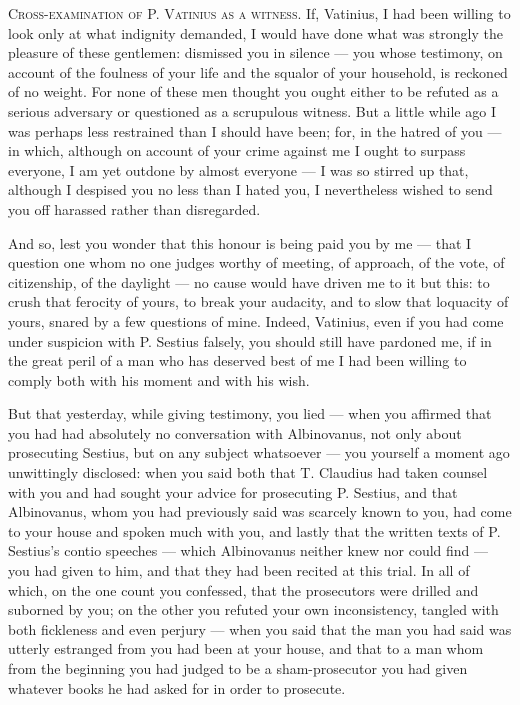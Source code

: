 
 \textsc{Cross-examination of P. Vatinius as a witness.} If, Vatinius, I had been willing to look only at what indignity demanded, I would have done what was strongly the pleasure of these gentlemen: dismissed you in silence --- you whose testimony, on account of the foulness of your life and the squalor of your household, is reckoned of no weight. For none of these men thought you ought either to be refuted as a serious adversary or questioned as a scrupulous witness. But a little while ago I was perhaps less restrained than I should have been; for, in the hatred of you --- in which, although on account of your crime against me I ought to surpass everyone, I am yet outdone by almost everyone --- I was so stirred up that, although I despised you no less than I hated you, I nevertheless wished to send you off harassed rather than disregarded.

 And so, lest you wonder that this honour is being paid you by me --- that I question one whom no one judges worthy of meeting, of approach, of the vote, of citizenship, of the daylight --- no cause would have driven me to it but this: to crush that ferocity of yours, to break your audacity, and to slow that loquacity of yours, snared by a few questions of mine. Indeed, Vatinius, even if you had come under suspicion with P. Sestius falsely, you should still have pardoned me, if in the great peril of a man who has deserved best of me I had been willing to comply both with his moment and with his wish.

 But that yesterday, while giving testimony, you lied --- when you affirmed that you had had absolutely no conversation with Albinovanus, not only about prosecuting Sestius, but on any subject whatsoever --- you yourself a moment ago unwittingly disclosed: when you said both that T. Claudius had taken counsel with you and had sought your advice for prosecuting P. Sestius, and that Albinovanus, whom you had previously said was scarcely known to you, had come to your house and spoken much with you, and lastly that the written texts of P. Sestius's contio speeches --- which Albinovanus neither knew nor could find --- you had given to him, and that they had been recited at this trial. In all of which, on the one count you confessed, that the prosecutors were drilled and suborned by you; on the other you refuted your own inconsistency, tangled with both fickleness and even perjury --- when you said that the man you had said was utterly estranged from you had been at your house, and that to a man whom from the beginning you had judged to be a sham-prosecutor you had given whatever books he had asked for in order to prosecute.

